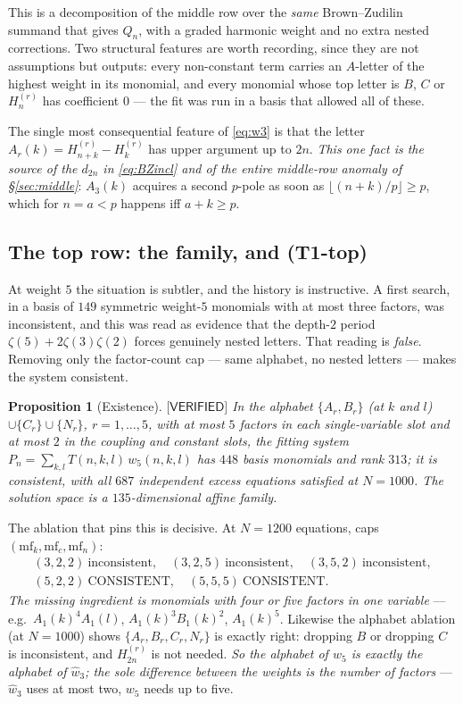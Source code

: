 \documentclass[11pt,reqno]{amsart}
\theoremstyle{plain}
\newtheorem{proposition}[theorem]{Proposition}
\theoremstyle{definition}
\theoremstyle{remark}
\numberwithin{equation}{section}
\newcommand{\wfive}{w_5}
\newcommand{\wthree}{\hat w_3}
\newcommand{\VERIFIED}{\textsf{[VERIFIED]}}
\begin{document}
This is a decomposition of the middle row over the \emph{same} Brown--Zudilin summand that
gives $Q_n$, with a graded harmonic weight and no extra nested corrections. Two structural
features are worth recording, since they are not assumptions but outputs: every non-constant
term carries an $A$-letter of the highest weight in its monomial, and every monomial whose top
letter is $B$, $C$ or $H^{(r)}_n$ has coefficient $0$ --- the fit was run in a basis that
allowed all of these.

The single most consequential feature of \eqref{eq:w3} is that the letter
$A_r(k)=H^{(r)}_{n+k}-H^{(r)}_k$ has upper argument up to $2n$. \emph{This one fact is the
source of the $d_{2n}$ in \eqref{eq:BZincl} and of the entire middle-row anomaly of
\S\ref{sec:middle}}: $A_3(k)$ acquires a second $p$-pole as soon as
$\lfloor(n+k)/p\rfloor\ge p$, which for $n=a<p$ happens iff $a+k\ge p$.

\subsection{The top row: the family, and (T1-top)}

At weight $5$ the situation is subtler, and the history is instructive. A first search, in a
basis of $149$ symmetric weight-$5$ monomials with at most three factors, was inconsistent, and
this was read as evidence that the depth-$2$ period $\zeta(5)+2\zeta(3)\zeta(2)$ forces
genuinely nested letters. That reading is \emph{false}. Removing only the factor-count cap ---
same alphabet, no nested letters --- makes the system consistent.

\begin{proposition}[Existence]\label{prop:w5exists}
$\VERIFIED$ In the alphabet $\{A_r,B_r\}$ (at $k$ and $l$) $\cup\{C_r\}\cup\{N_r\}$,
$r=1,\dots,5$, with at most $5$ factors in each single-variable slot and at most $2$ in the
coupling and constant slots, the fitting system
$P_n=\sum_{k,l}T(n,k,l)\,\wfive(n,k,l)$ has $448$ basis monomials and rank $313$; it is
\emph{consistent}, with all $687$ independent excess equations satisfied at $N=1000$. The
solution space is a $135$-dimensional affine family.
\end{proposition}

The ablation that pins this is decisive. At $N=1200$ equations, caps
$(\mathrm{mf}_k,\mathrm{mf}_c,\mathrm{mf}_n)$:
\[
\begin{gathered}
(3,2,2)\ \text{inconsistent},\quad(3,2,5)\ \text{inconsistent},\quad(3,5,2)\ \text{inconsistent},\\
(5,2,2)\ \text{CONSISTENT},\quad(5,5,5)\ \text{CONSISTENT}.
\end{gathered}
\]
\emph{The missing ingredient is monomials with four or five factors in one variable} ---
e.g.\ $A_1(k)^4A_1(l)$, $A_1(k)^3B_1(k)^2$, $A_1(k)^5$. Likewise the alphabet ablation
(at $N=1000$) shows $\{A_r,B_r,C_r,N_r\}$ is exactly right: dropping $B$ or dropping $C$
is inconsistent, and $H^{(r)}_{2n}$ is not needed. \emph{So the alphabet of $\wfive$ is
exactly the alphabet of $\wthree$; the sole difference between the weights is the number of
factors} --- $\wthree$ uses at most two, $\wfive$ needs up to five.
\end{document}
